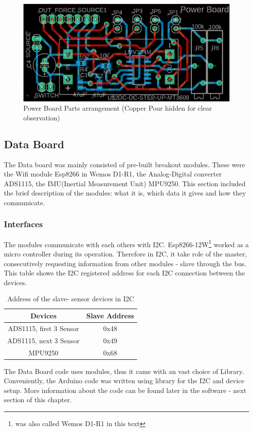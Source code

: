 \documentclass[12 pt, a4paper]{thesis}
\begin{document}
\begin{figure}[hbt!]
\begin{center}
\includegraphics[width = 150mm]{PowerBrd.png}
\caption{Power Board Parts arrangement (Copper Pour hidden for clear observation)}
\end{center}
\end{figure}
\pagebreak
\subsection{Data Board}
The Data board was mainly consisted of pre-built breakout modules. These were the Wifi module Esp8266 in Wemos D1-R1, the Analog-Digital converter ADS1115, the IMU(Inertial Measurement Unit) MPU9250. This section included the brief description of the modules: what it is, which data it gives and how they communicate.\\
\subsubsection{Interfaces}
The modules communicate with each others with I2C. Esp8266-12W\footnote{was also called Wemos D1-R1 in this text} worked as a micro controller during its operation. Therefore in I2C, it take role of the master, consecutively requesting information from other modules - slave through the bus.\\
This table shows the I2C registered address for each I2C connection between the devices.
\begin{table}[hbt!]
\begin{center}
\begin{tabular}{|c|c|}
\hline
Devices & Slave Address\\
\hline
ADS1115, first 3 Sensor & 0x48\\
\hline
ADS1115, next 3 Sensor & 0x49\\	
\hline
MPU9250 & 0x68\\
\hline
\end{tabular}
\end{center}
\caption{Address of the slave- sensor devices in I2C}
\end{table}
The Data Board code uses modules, thus it came with an vast choice of Library. Conveniently, the Arduino code was written using library for the I2C and device setup. More information about the code can be found later in the software - next section of this chapter.
\end{document}
